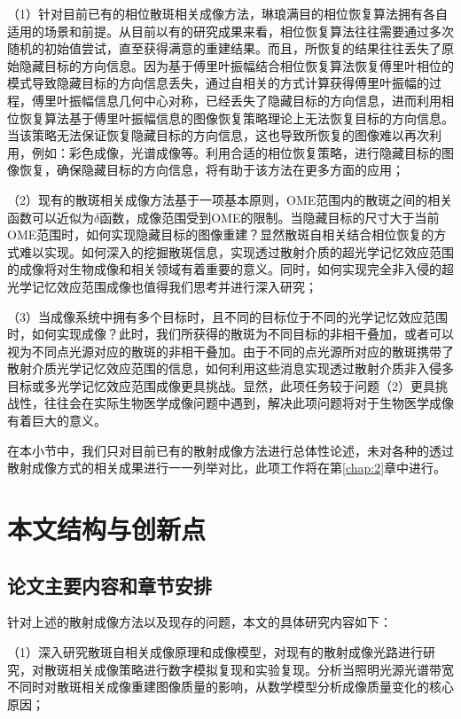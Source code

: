 （1）针对目前已有的相位散斑相关成像方法，琳琅满目的相位恢复算法拥有各自适用的场景和前提。从目前以有的研究成果来看，相位恢复算法往往需要通过多次随机的初始值尝试，直至获得满意的重建结果。而且，所恢复的结果往往丢失了原始隐藏目标的方向信息。因为基于傅里叶振幅结合相位恢复算法恢复傅里叶相位的模式导致隐藏目标的方向信息丢失，通过自相关的方式计算获得傅里叶振幅的过程，傅里叶振幅信息几何中心对称，已经丢失了隐藏目标的方向信息，进而利用相位恢复算法基于傅里叶振幅信息的图像恢复策略理论上无法恢复目标的方向信息。当该策略无法保证恢复隐藏目标的方向信息，这也导致所恢复的图像难以再次利用，例如：彩色成像，光谱成像等。利用合适的相位恢复策略，进行隐藏目标的图像恢复，确保隐藏目标的方向信息，将有助于该方法在更多方面的应用；

（2）现有的散斑相关成像方法基于一项基本原则，OME范围内的散斑之间的相关函数可以近似为$\delta$函数，成像范围受到OME的限制。当隐藏目标的尺寸大于当前OME范围时，如何实现隐藏目标的图像重建？显然散斑自相关结合相位恢复的方式难以实现。如何深入的挖掘散斑信息，实现透过散射介质的超光学记忆效应范围的成像将对生物成像和相关领域有着重要的意义。同时，如何实现完全非入侵的超光学记忆效应范围成像也值得我们思考并进行深入研究；

（3）当成像系统中拥有多个目标时，且不同的目标位于不同的光学记忆效应范围时，如何实现成像？此时，我们所获得的散斑为不同目标的非相干叠加，或者可以视为不同点光源对应的散斑的非相干叠加。由于不同的点光源所对应的散斑携带了散射介质光学记忆效应范围的信息，如何利用这些消息实现透过散射介质非入侵多目标或多光学记忆效应范围成像更具挑战。显然，此项任务较于问题（2）更具挑战性，往往会在实际生物医学成像问题中遇到，解决此项问题将对于生物医学成像有着巨大的意义。

在本小节中，我们只对目前已有的散射成像方法进行总体性论述，未对各种的透过散射成像方式的相关成果进行一一列举对比，此项工作将在第\ref{chap:2}章中进行。

\section{本文结构与创新点}

\subsection{论文主要内容和章节安排}
针对上述的散射成像方法以及现存的问题，本文的具体研究内容如下：

（1）深入研究散斑自相关成像原理和成像模型，对现有的散射成像光路进行研究，对散斑相关成像策略进行数字模拟复现和实验复现。分析当照明光源光谱带宽不同时对散斑相关成像重建图像质量的影响，从数学模型分析成像质量变化的核心原因；

